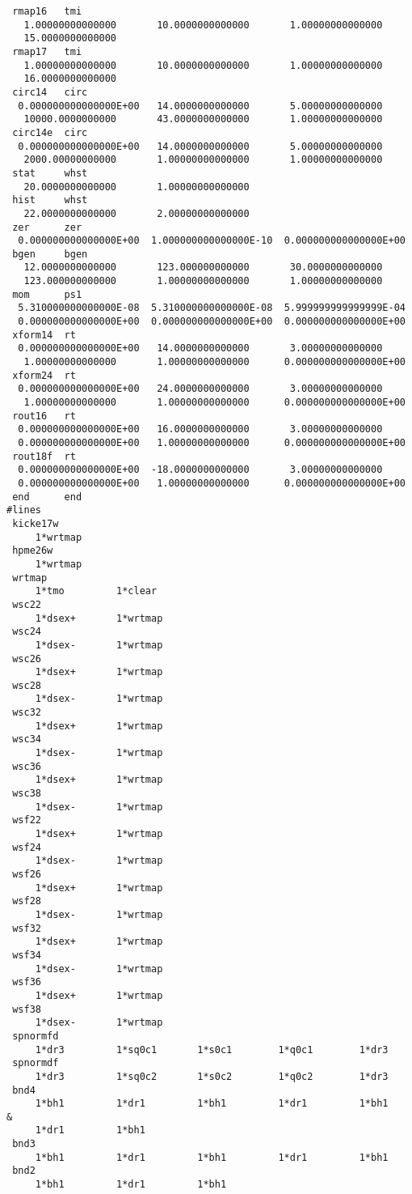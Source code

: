 \begin{footnotesize}
\begin{verbatim}
 rmap16   tmi
   1.00000000000000       10.0000000000000       1.00000000000000
   15.0000000000000
 rmap17   tmi
   1.00000000000000       10.0000000000000       1.00000000000000
   16.0000000000000
 circ14   circ
  0.000000000000000E+00   14.0000000000000       5.00000000000000
   10000.0000000000       43.0000000000000       1.00000000000000
 circ14e  circ
  0.000000000000000E+00   14.0000000000000       5.00000000000000
   2000.00000000000       1.00000000000000       1.00000000000000
 stat     whst
   20.0000000000000       1.00000000000000
 hist     whst
   22.0000000000000       2.00000000000000
 zer      zer
  0.000000000000000E+00  1.000000000000000E-10  0.000000000000000E+00
 bgen     bgen
   12.0000000000000       123.000000000000       30.0000000000000
   123.000000000000       1.00000000000000       1.00000000000000
 mom      ps1
  5.310000000000000E-08  5.310000000000000E-08  5.999999999999999E-04
  0.000000000000000E+00  0.000000000000000E+00  0.000000000000000E+00
 xform14  rt
  0.000000000000000E+00   14.0000000000000       3.00000000000000
   1.00000000000000       1.00000000000000      0.000000000000000E+00
 xform24  rt
  0.000000000000000E+00   24.0000000000000       3.00000000000000
   1.00000000000000       1.00000000000000      0.000000000000000E+00
 rout16   rt
  0.000000000000000E+00   16.0000000000000       3.00000000000000
  0.000000000000000E+00   1.00000000000000      0.000000000000000E+00
 rout18f  rt
  0.000000000000000E+00  -18.0000000000000       3.00000000000000
  0.000000000000000E+00   1.00000000000000      0.000000000000000E+00
 end      end
#lines
 kicke17w
     1*wrtmap
 hpme26w
     1*wrtmap
 wrtmap
     1*tmo         1*clear
 wsc22
     1*dsex+       1*wrtmap
 wsc24
     1*dsex-       1*wrtmap
 wsc26
     1*dsex+       1*wrtmap
 wsc28
     1*dsex-       1*wrtmap
 wsc32
     1*dsex+       1*wrtmap
 wsc34
     1*dsex-       1*wrtmap
 wsc36
     1*dsex+       1*wrtmap
 wsc38
     1*dsex-       1*wrtmap
 wsf22
     1*dsex+       1*wrtmap
 wsf24
     1*dsex-       1*wrtmap
 wsf26
     1*dsex+       1*wrtmap
 wsf28
     1*dsex-       1*wrtmap
 wsf32
     1*dsex+       1*wrtmap
 wsf34
     1*dsex-       1*wrtmap
 wsf36
     1*dsex+       1*wrtmap
 wsf38
     1*dsex-       1*wrtmap
 spnormfd
     1*dr3         1*sq0c1       1*s0c1        1*q0c1        1*dr3
 spnormdf
     1*dr3         1*sq0c2       1*s0c2        1*q0c2        1*dr3
 bnd4
     1*bh1         1*dr1         1*bh1         1*dr1         1*bh1      &
     1*dr1         1*bh1
 bnd3
     1*bh1         1*dr1         1*bh1         1*dr1         1*bh1
 bnd2
     1*bh1         1*dr1         1*bh1

\end{verbatim}
\end{footnotesize}
